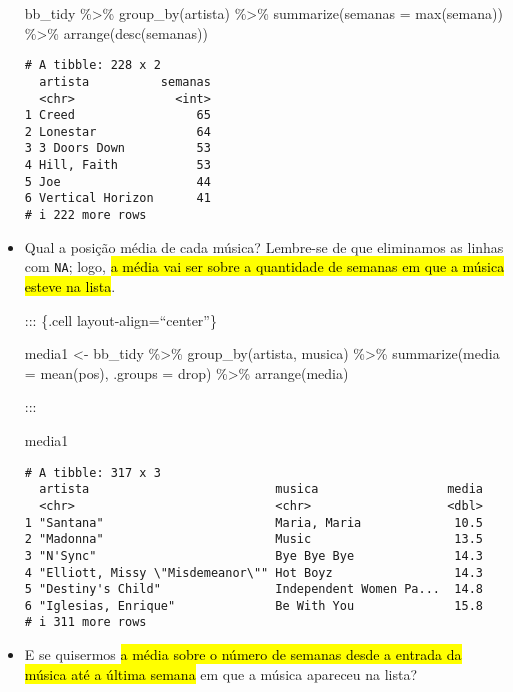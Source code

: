 \documentclass[
  letterpaper,
  DIV=11,
  numbers=noendperiod]{scrreprt}
\newenvironment{Shaded}{\begin{snugshade}}{\end{snugshade}}
\newcommand{\AttributeTok}[1]{\textcolor[rgb]{0.40,0.45,0.13}{#1}}
\newcommand{\FunctionTok}[1]{\textcolor[rgb]{0.28,0.35,0.67}{#1}}
\newcommand{\NormalTok}[1]{\textcolor[rgb]{0.00,0.23,0.31}{#1}}
\newcommand{\OtherTok}[1]{\textcolor[rgb]{0.00,0.23,0.31}{#1}}
\newcommand{\SpecialCharTok}[1]{\textcolor[rgb]{0.37,0.37,0.37}{#1}}
\newcommand{\StringTok}[1]{\textcolor[rgb]{0.13,0.47,0.30}{#1}}
\begin{document}
\begin{itemize}
\begin{Shaded}
\begin{Highlighting}[]
\NormalTok{bb\_tidy }\SpecialCharTok{\%\textgreater{}\%} 
  \FunctionTok{group\_by}\NormalTok{(artista) }\SpecialCharTok{\%\textgreater{}\%} 
  \FunctionTok{summarize}\NormalTok{(}\AttributeTok{semanas =} \FunctionTok{max}\NormalTok{(semana)) }\SpecialCharTok{\%\textgreater{}\%} 
  \FunctionTok{arrange}\NormalTok{(}\FunctionTok{desc}\NormalTok{(semanas))}
\end{Highlighting}
\end{Shaded}

\begin{verbatim}
# A tibble: 228 x 2
  artista          semanas
  <chr>              <int>
1 Creed                 65
2 Lonestar              64
3 3 Doors Down          53
4 Hill, Faith           53
5 Joe                   44
6 Vertical Horizon      41
# i 222 more rows
\end{verbatim}
\item
  Qual a posição média de cada música? Lembre-se de que eliminamos as
  linhas com \texttt{NA}; logo, {\hl{a média vai ser sobre a quantidade
  de semanas em que a música esteve na lista}}.

  ::: \{.cell layout-align=``center''\}

\begin{Shaded}
\begin{Highlighting}[]
\NormalTok{media1 }\OtherTok{\textless{}{-}}\NormalTok{ bb\_tidy }\SpecialCharTok{\%\textgreater{}\%} 
  \FunctionTok{group\_by}\NormalTok{(artista, musica) }\SpecialCharTok{\%\textgreater{}\%} 
  \FunctionTok{summarize}\NormalTok{(}\AttributeTok{media =} \FunctionTok{mean}\NormalTok{(pos), }\AttributeTok{.groups =} \StringTok{\textquotesingle{}drop\textquotesingle{}}\NormalTok{) }\SpecialCharTok{\%\textgreater{}\%} 
  \FunctionTok{arrange}\NormalTok{(media)}
\end{Highlighting}
\end{Shaded}

  :::

\begin{Shaded}
\begin{Highlighting}[]
\NormalTok{media1}
\end{Highlighting}
\end{Shaded}

\begin{verbatim}
# A tibble: 317 x 3
  artista                          musica                  media
  <chr>                            <chr>                   <dbl>
1 "Santana"                        Maria, Maria             10.5
2 "Madonna"                        Music                    13.5
3 "N'Sync"                         Bye Bye Bye              14.3
4 "Elliott, Missy \"Misdemeanor\"" Hot Boyz                 14.3
5 "Destiny's Child"                Independent Women Pa...  14.8
6 "Iglesias, Enrique"              Be With You              15.8
# i 311 more rows
\end{verbatim}
\item
  E se quisermos {\hl{a média sobre o número de semanas desde a entrada
  da música até a última semana}} em que a música apareceu na lista?


\end{itemize}
\end{document}
